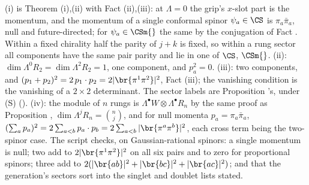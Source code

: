 (i) is Theorem (i),(ii) with Fact (ii),(iii): at $\Lambda = 0$ the grip's $x$-slot part is the momentum, and the momentum of a single conformal spinor $\psi_{a} \in \CS$ is $\pi_{a}\bar\pi_{a}$, null and future-directed; for $\psi_{a} \in \CSm{}$ the same by the conjugation of Fact . Within a fixed chirality half the parity of $j + k$ is fixed, so within a rung sector all components have the same pair parity and lie in one of $\CS$, $\CSm{}$. (ii): $\dim\Lambda^{0}R_{2} = \dim\Lambda^{2}R_{2} = 1$, one component, and $p_{a}^{2} = 0$. (iii): two components, and $(p_{1} + p_{2})^{2} = 2\,p_{1} \cdot p_{2} = 2|\br{\pi^{1}\pi^{2}}|^{2}$, Fact (iii); the vanishing condition is the vanishing of a $2 \times 2$ determinant. The sector labels are Proposition 's, under (S) (). (iv): the module of $n$ rungs is $\Lambda^{\bullet}W \otimes \Lambda^{\bullet}R_{n}$ by the same proof as Proposition , $\dim\Lambda^{j}R_{n} = \binom{n}{j}$, and for null momenta $p_{a} = \pi_{a}\bar\pi_{a}$, $(\sum_{a} p_{a})^{2} = 2\sum_{a<b}p_{a} \cdot p_{b} = 2\sum_{a<b}|\br{\pi^{a}\pi^{b}}|^{2}$, each cross term being the two-spinor case. The script checks, on Gaussian-rational spinors: a single momentum is null; two add to $2|\br{\pi^{1}\pi^{2}}|^{2}$ on all six pairs and to zero for proportional spinors; three add to $2(|\br{ab}|^{2} + |\br{bc}|^{2} + |\br{ac}|^{2})$; and that the generation's sectors sort into the singlet and doublet lists stated.
